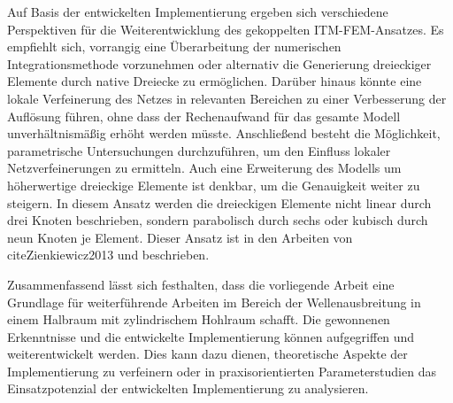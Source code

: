 Auf Basis der entwickelten Implementierung ergeben sich verschiedene Perspektiven für die Weiterentwicklung des gekoppelten ITM-FEM-Ansatzes. 
Es empfiehlt sich, vorrangig eine Überarbeitung der numerischen Integrationsmethode vorzunehmen oder alternativ die Generierung dreieckiger Elemente durch native Dreiecke zu ermöglichen. 
Darüber hinaus könnte eine lokale Verfeinerung des Netzes in relevanten Bereichen zu einer Verbesserung der Auflösung führen, ohne dass der Rechenaufwand für das gesamte Modell unverhältnismäßig erhöht werden müsste. 
Anschließend besteht die Möglichkeit, parametrische Untersuchungen durchzuführen, um den Einfluss lokaler Netzverfeinerungen zu ermitteln.
Auch eine Erweiterung des Modells um höherwertige dreieckige Elemente ist denkbar, um die Genauigkeit weiter zu steigern.
In diesem Ansatz werden die dreieckigen Elemente nicht linear durch drei Knoten beschrieben, sondern parabolisch durch sechs oder kubisch durch neun Knoten je Element. Dieser Ansatz ist in den Arbeiten von cite{Zienkiewicz2013} und \cite{Klein2003} beschrieben. 

 Zusammenfassend lässt sich festhalten, dass die vorliegende Arbeit eine Grundlage für weiterführende Arbeiten im Bereich der Wellenausbreitung in einem Halbraum mit zylindrischem Hohlraum schafft. 
 Die gewonnenen Erkenntnisse und die entwickelte Implementierung können aufgegriffen und weiterentwickelt werden. 
 Dies kann dazu dienen, theoretische Aspekte der Implementierung zu verfeinern oder in praxisorientierten Parameterstudien das Einsatzpotenzial der entwickelten Implementierung zu analysieren.